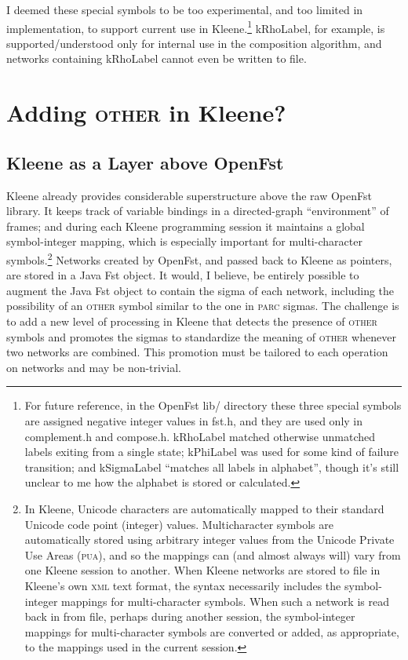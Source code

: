\documentclass[letterpaper,11pt]{article}
\providecommand{\acro}{}\renewcommand{\acro}{\textsc}
\begin{document}
\noindent
I deemed these special symbols to be too experimental, and too
limited in implementation, to support
current use in Kleene.\footnote{For future reference, in the OpenFst lib/ directory
these three special symbols are
assigned negative integer values in fst.h, and they are used only in complement.h and
compose.h.  kRhoLabel matched otherwise unmatched labels exiting from a single state;
kPhiLabel was used for some kind of failure transition; and kSigmaLabel ``matches all
labels in alphabet'', though it's still unclear to me how the alphabet is stored or
calculated.} kRhoLabel, for example, is supported/understood only for internal use in the composition
algorithm, and networks containing kRhoLabel cannot even be written to file.

\section{Adding \acro{other} in Kleene?}

\subsection{Kleene as a Layer above OpenFst}

Kleene already provides considerable superstructure above the raw OpenFst library.  It
keeps track of variable bindings in a directed-graph ``environment''
of frames; and
during each Kleene programming session it
maintains a global symbol-integer mapping, which is especially important for
multi-character symbols.\footnote{In Kleene, Unicode characters are automatically mapped to their standard
Unicode code point (integer) values.
Multicharacter symbols are automatically 
stored using arbitrary integer values from the Unicode Private Use Areas
(\acro{pua}), and so the mappings can (and almost always will) vary from one Kleene session to another.
When Kleene networks are stored to file in Kleene's own \acro{xml} text format, 
the syntax necessarily includes the symbol-integer mappings for
multi-character symbols.  When such a network is read
back in from file, perhaps during another session, the
symbol-integer mappings for multi-character symbols
are converted or added, as appropriate, to the
mappings used in the current session.
}  Networks created by OpenFst, and passed back to Kleene as
pointers, are stored in a Java Fst object.  It would, I believe, be entirely possible to
augment the Java Fst object to contain the sigma of each network, including the possibility of
an \acro{other}
symbol similar to the one in \acro{parc} sigmas.  The challenge is to add a new level of
processing in Kleene that detects the presence of \acro{other} symbols and promotes the
sigmas to standardize the meaning of \acro{other} whenever two networks are combined.  This
promotion must be tailored to each operation on networks and may be
non-trivial.
\end{document}
